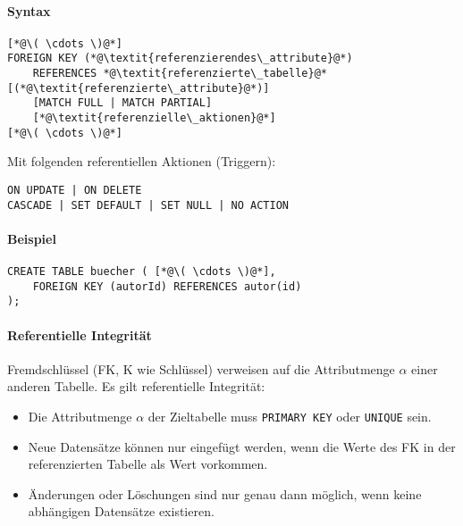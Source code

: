             	\paragraph{Syntax}
            		\begin{lstlisting}
[*@\( \cdots \)@*]
FOREIGN KEY (*@\textit{referenzierendes\_attribute}@*)
	REFERENCES *@\textit{referenzierte\_tabelle}@* [(*@\textit{referenzierte\_attribute}@*)]
	[MATCH FULL | MATCH PARTIAL]
	[*@\textit{referenzielle\_aktionen}@*]
[*@\( \cdots \)@*]
            		\end{lstlisting}
            		
            		Mit folgenden referentiellen Aktionen (Triggern):
            		\begin{lstlisting}
ON UPDATE | ON DELETE
CASCADE | SET DEFAULT | SET NULL | NO ACTION
            		\end{lstlisting}
            
            	\paragraph{Beispiel}
            		\begin{lstlisting}
CREATE TABLE buecher ( [*@\( \cdots \)@*],
	FOREIGN KEY (autorId) REFERENCES autor(id)
);
            		\end{lstlisting}
            	
            	\paragraph{Referentielle Integrität}
            		Fremdschlüssel (FK, K wie Schlüssel) verweisen auf die Attributmenge \( \alpha \) einer anderen Tabelle. Es gilt referentielle Integrität:
            		\begin{itemize}
            			\item Die Attributmenge \(\alpha\) der Zieltabelle muss \lstinline|PRIMARY KEY| oder \lstinline|UNIQUE| sein.
            			\item Neue Datensätze können nur eingefügt werden, wenn die Werte des FK in der referenzierten Tabelle als Wert vorkommen.
            			\item Änderungen oder Löschungen sind nur genau dann möglich, wenn keine abhängigen Datensätze existieren.
            		\end{itemize}
            	
